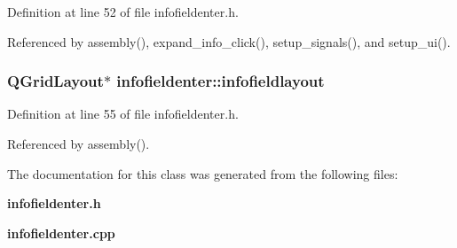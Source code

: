 Definition at line 52 of file infofieldenter.h.

Referenced by assembly(), expand\_\-info\_\-click(), setup\_\-signals(), and setup\_\-ui().
\subsubsection{\setlength{\rightskip}{0pt plus 5cm}QGrid\-Layout$\ast$ {\bf infofieldenter::infofieldlayout}\hspace{0.3cm}{\tt  [private]}}\label{classinfofieldenter_430f081ceaa69eb3431a5abd2a11205e}




Definition at line 55 of file infofieldenter.h.

Referenced by assembly().

The documentation for this class was generated from the following files:\begin{CompactItemize}
\item 
{\bf infofieldenter.h}\item 
{\bf infofieldenter.cpp}\end{CompactItemize}
